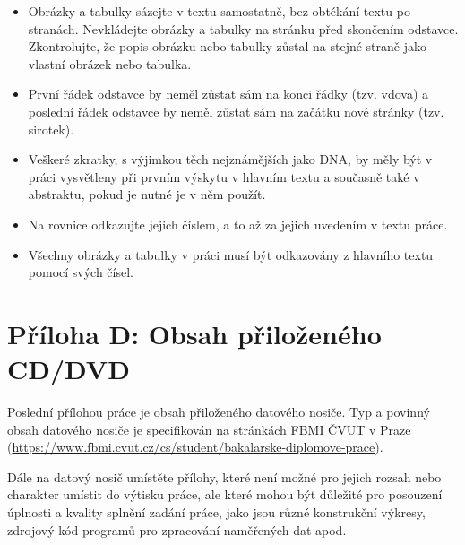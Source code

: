     \begin{itemize}
        \item Obrázky a tabulky sázejte v textu samostatně, bez obtékání textu po stranách. Nevkládejte obrázky a tabulky na stránku před skončením odstavce. Zkontrolujte, že popis obrázku nebo tabulky zůstal na stejné straně jako vlastní obrázek nebo tabulka.
        \item První řádek odstavce by neměl zůstat sám na konci řádky (tzv. vdova) a poslední řádek odstavce by neměl zůstat sám na začátku nové stránky (tzv. sirotek).
        \item Veškeré zkratky, s výjimkou těch nejznámějších jako DNA, by měly být v práci vysvětleny při prvním výskytu v hlavním textu a současně také v abstraktu, pokud je nutné je v něm použít.
        \item Na rovnice odkazujte jejich číslem, a to až za jejich uvedením v textu práce.
        \item Všechny obrázky a tabulky v práci musí být odkazovány z hlavního textu pomocí svých čísel. 
    \end{itemize}

\clearpage

\section*{Příloha D: Obsah přiloženého CD/DVD}
    \label{app:obsah}
    
    Poslední přílohou práce je obsah přiloženého datového nosiče. 
    Typ a povinný obsah datového nosiče je specifikován na stránkách FBMI ČVUT v Praze (\url{https://www.fbmi.cvut.cz/cs/student/bakalarske-diplomove-prace}).
    
    Dále na datový nosič umístěte přílohy, které není možné pro jejich rozsah nebo charakter umístit do výtisku práce, ale které mohou být důležité pro posouzení úplnosti a kvality splnění zadání práce, jako jsou různé konstrukční výkresy, zdrojový kód programů pro zpracování naměřených dat apod.